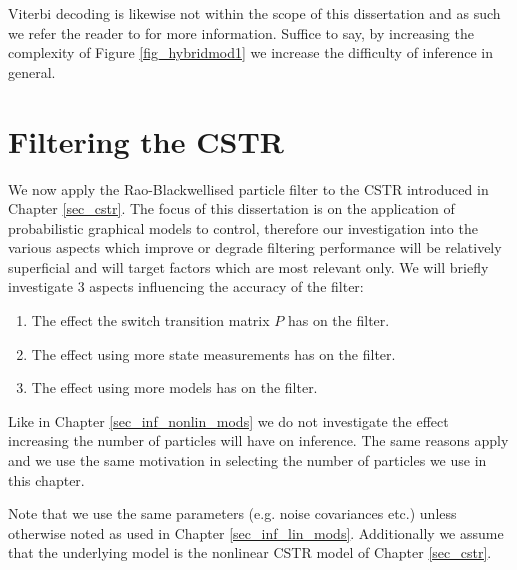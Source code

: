 Viterbi decoding is likewise not within the scope of this dissertation and as such we refer the reader to \cite{murphy1} for more information. Suffice to say, by increasing the complexity of Figure \ref{fig_hybridmod1} we increase the difficulty of inference in general.

\section{Filtering the CSTR}
\label{sec_rbpf_filtering_cstr}
We now apply the Rao-Blackwellised particle filter to the CSTR introduced in Chapter \ref{sec_cstr}. The focus of this dissertation is on the application of probabilistic graphical models to control, therefore our investigation into the various aspects which improve or degrade filtering performance will be relatively superficial and will target factors which are most relevant only. We will briefly investigate 3 aspects influencing the accuracy of the filter:
\begin{enumerate}
\item
The effect the switch transition matrix $P$ has on the filter.
\item
The effect using more state measurements has on the filter.
\item
The effect using more models has on the filter.
\end{enumerate}
Like in Chapter \ref{sec_inf_nonlin_mods} we do not investigate the effect increasing the number of particles will have on inference. The same reasons apply and we use the same motivation in selecting the number of particles we use in this chapter.

Note that we use the same parameters (e.g. noise covariances etc.) unless otherwise noted as used in Chapter \ref{sec_inf_lin_mods}. Additionally we assume that the underlying model is the nonlinear CSTR model of Chapter \ref{sec_cstr}.

